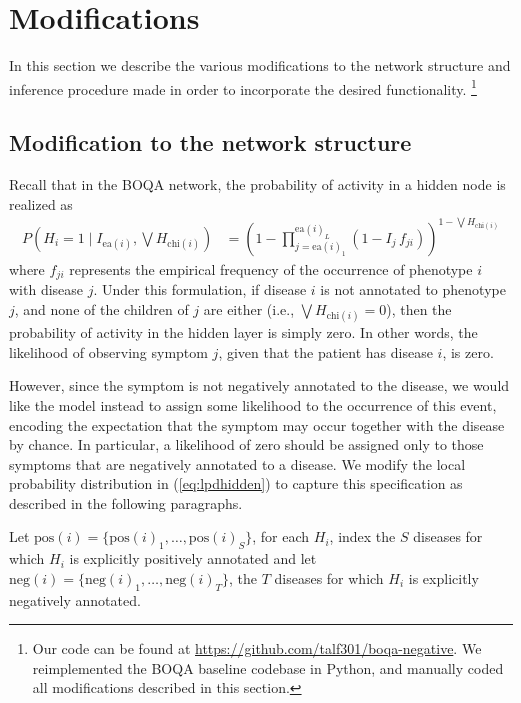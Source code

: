 \section{Modifications}
\label{sec:models}

In this section we describe the various modifications to
the network structure and inference procedure made in order to incorporate the
desired functionality.
\footnote{
    Our code can be found at
    \url{https://github.com/talf301/boqa-negative}.
    We reimplemented the BOQA baseline codebase in Python, and manually coded all
    modifications described in this section.
}

\subsection{Modification to the network structure}
\label{subsec:modnetstruct}

Recall that in the BOQA network, the probability of activity in a hidden node is
realized as  
%
\begin{align}\label{eq:lpdhidden}
    P \left(H_i = 1 \mid I_{\text{ea}(i)}, \bigvee H_{\text{chi}(i)}\right)
    &= \left(
        1 - \prod_{j=\text{ea}(i)_1}^{\text{ea}(i)_L}
        \left(1 - I_j \, f_{ji}\right)
    \right)
    ^{1 - \bigvee H_{\text{chi}(i)}}
\end{align}
%
where $f_{ji}$ represents the empirical frequency of the occurrence of phenotype
$i$ with disease $j$.
%
Under this formulation, if disease $i$ is not annotated to phenotype $j$, 
and none of the children of $j$ are either (i.e., $\bigvee H_{\text{chi}(i)} = 0$),
then the probability of activity in the hidden layer is simply zero.
%
In other words, the likelihood of observing symptom $j$, given that the patient
has disease $i$, is zero.

However, since the symptom is not negatively annotated to the disease, we would
like the model instead to assign some likelihood to the occurrence of this event,
encoding the expectation that the symptom may occur together with the disease
by chance.
%
In particular, a likelihood of zero should be assigned only to those symptoms
that are negatively annotated to a disease.
%
We modify the local probability distribution in (\ref{eq:lpdhidden}) to capture
this specification as described in the following paragraphs.

Let $\text{pos}(i) = \{\text{pos}(i)_1, \hdots, \text{pos}(i)_S\}$, for each
$H_i$, index the $S$ diseases for which $H_i$ is explicitly positively
annotated and let $\text{neg}(i) = \{\text{neg}(i)_1, \hdots,
\text{neg}(i)_T\}$, the $T$ diseases for which $H_i$ is explicitly negatively
annotated.


